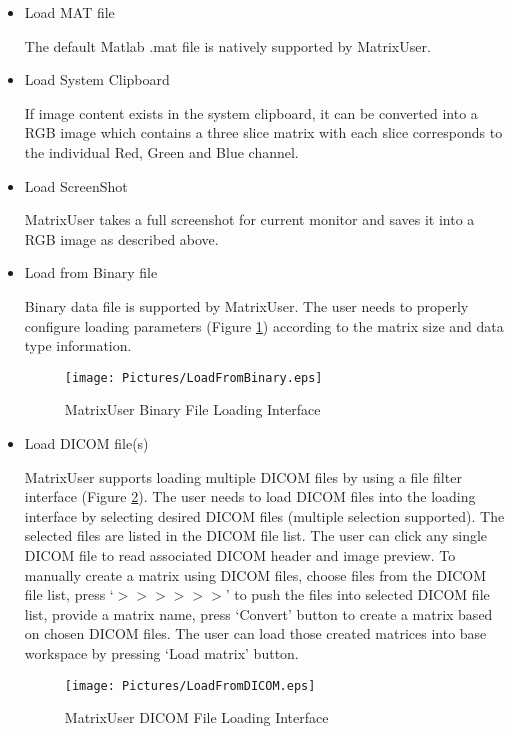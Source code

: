 \documentclass{article}%
\begin{document}
	\begin{itemize}
	
	\item Load MAT file

The default Matlab .mat file is natively supported by MatrixUser.

	\item Load System Clipboard
	
If image content exists in the system clipboard, it can be converted into a RGB image which contains a three slice matrix with each slice corresponds to the individual Red, Green and Blue channel.

  \item Load ScreenShot

MatrixUser takes a full screenshot for current monitor and saves it into a RGB image as described above.
	
	\item Load from Binary file

Binary data file is supported by MatrixUser. The user needs to properly configure loading parameters (Figure \ref{fig:LoadFromBinary}) according to the matrix size and data type information.

\begin{figure}[htbp]
	\centering
		\texttt{[image: Pictures/LoadFromBinary.eps]}
	\caption{MatrixUser Binary File Loading Interface}
	\label{fig:LoadFromBinary}
\end{figure}	

 \item Load DICOM file(s)
		
MatrixUser supports loading multiple DICOM files by using a file filter interface (Figure \ref{fig:LoadFromDICOM}). The user needs to load DICOM files into the loading interface by selecting desired DICOM files (multiple selection supported). The selected files are listed in the DICOM file list. The user can click any single DICOM file to read associated DICOM header and image preview. To manually create a matrix using DICOM files, choose files from the DICOM file list, press `$>>>>>>$' to push the files into selected DICOM file list, provide a matrix name, press `Convert' button to create a matrix based on chosen DICOM files. The user can load those created matrices into base workspace by pressing `Load matrix' button.
		
\begin{figure}[htbp]
	\centering
		\texttt{[image: Pictures/LoadFromDICOM.eps]}
	\caption{MatrixUser DICOM File Loading Interface}
	\label{fig:LoadFromDICOM}
\end{figure}	


\end{itemize}
\end{document}
